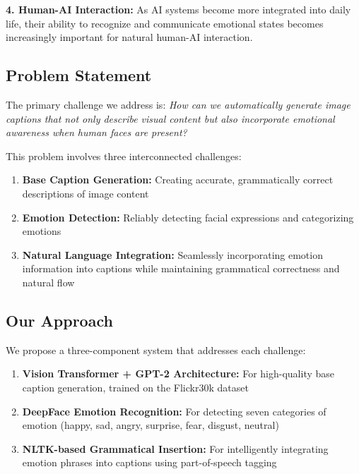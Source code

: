 \documentclass[12pt]{article}
\begin{document}
\textbf{4. Human-AI Interaction:} As AI systems become more integrated into daily life, their ability to recognize and communicate emotional states becomes increasingly important for natural human-AI interaction.

\subsection{Problem Statement}
The primary challenge we address is: \textit{How can we automatically generate image captions that not only describe visual content but also incorporate emotional awareness when human faces are present?}

This problem involves three interconnected challenges:
\begin{enumerate}
\item \textbf{Base Caption Generation:} Creating accurate, grammatically correct descriptions of image content
\item \textbf{Emotion Detection:} Reliably detecting facial expressions and categorizing emotions
\item \textbf{Natural Language Integration:} Seamlessly incorporating emotion information into captions while maintaining grammatical correctness and natural flow
\end{enumerate}

\subsection{Our Approach}
We propose a three-component system that addresses each challenge:

\begin{enumerate}
\item \textbf{Vision Transformer + GPT-2 Architecture:} For high-quality base caption generation, trained on the Flickr30k dataset
\item \textbf{DeepFace Emotion Recognition:} For detecting seven categories of emotion (happy, sad, angry, surprise, fear, disgust, neutral)
\item \textbf{NLTK-based Grammatical Insertion:} For intelligently integrating emotion phrases into captions using part-of-speech tagging
\end{enumerate}
\end{document}
